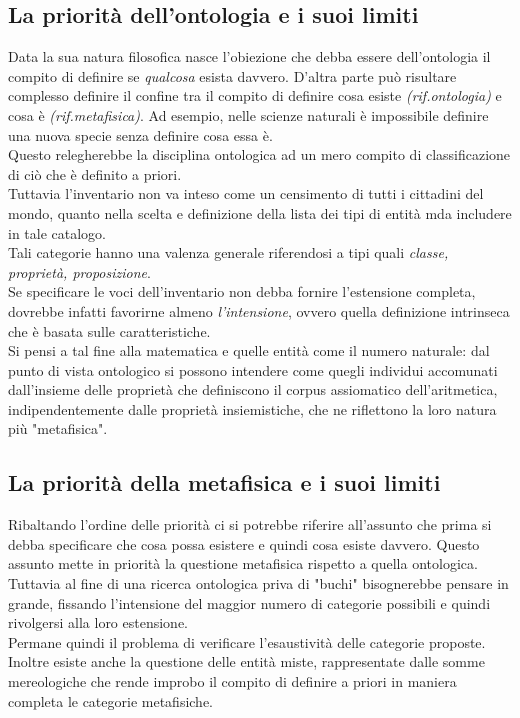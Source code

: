 \documentclass[a4paper,12pt]{article}
\begin{document}
\subsection{La priorità dell'ontologia e i suoi limiti} %
Data la sua natura filosofica nasce l'obiezione che debba essere
dell'ontologia il compito di definire se \textit{qualcosa} esista davvero.
D'altra parte può risultare complesso definire il confine tra il compito di definire
cosa esiste \textit{(rif.ontologia)} e cosa è \textit{(rif.metafisica)}. Ad esempio, nelle scienze
naturali è impossibile definire una nuova specie senza definire cosa essa è. 
\\ Questo relegherebbe la disciplina ontologica ad un mero compito di classificazione di ciò che è definito a priori.
\\ Tuttavia l'inventario non va inteso come un censimento di tutti i cittadini del mondo, quanto
nella scelta e definizione della lista dei tipi di entità mda includere in tale catalogo. 
\\ Tali categorie hanno una valenza generale riferendosi a tipi quali \textit{classe, proprietà, proposizione}.
\\ Se specificare le voci dell'inventario non debba fornire l'estensione completa, dovrebbe infatti 
favorirne almeno \textit{l'intensione}, ovvero quella definizione intrinseca che è basata sulle 
caratteristiche. 
\\Si pensi a tal fine alla matematica e quelle entità come il numero naturale: dal
punto di vista ontologico si possono intendere come quegli individui accomunati dall'insieme delle
proprietà che definiscono il corpus assiomatico dell'aritmetica, indipendentemente dalle proprietà
insiemistiche, che ne riflettono la loro natura più "metafisica".

\subsection{La priorità della metafisica e i suoi limiti} %
Ribaltando l'ordine delle priorità ci si potrebbe riferire all'assunto che prima si debba specificare 
che cosa possa esistere e quindi cosa esiste davvero. Questo assunto mette in priorità la questione
metafisica rispetto a quella ontologica.
\\ Tuttavia al fine di una ricerca ontologica priva di "buchi" bisognerebbe pensare in grande, fissando
l'intensione del maggior numero di categorie possibili e quindi rivolgersi alla loro estensione.
\\ Permane quindi il problema di verificare l'esaustività delle categorie proposte. Inoltre
esiste anche la questione delle entità miste, rappresentate dalle somme mereologiche che rende improbo
il compito di definire a priori in maniera completa le categorie metafisiche. 
\end{document}
